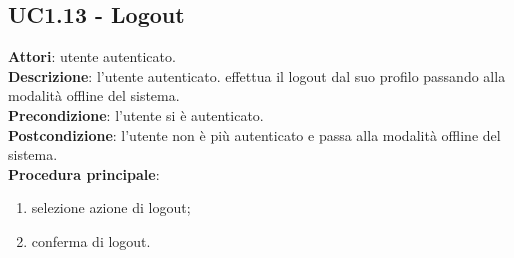 \subsection{UC1.13 - Logout}{
	\label{uc1.13}
	\textbf{Attori}: utente autenticato.\\
	\textbf{Descrizione}: l'utente autenticato. effettua il logout dal suo profilo passando alla modalità offline del sistema.\\
	\textbf{Precondizione}: l'utente si è autenticato.\\
	\textbf{Postcondizione}: l'utente non è più autenticato e passa alla modalità offline del sistema.\\
	\textbf{Procedura principale}:
	\begin{enumerate}
		\item selezione azione di logout;
		\item conferma di logout.
	\end{enumerate}
}